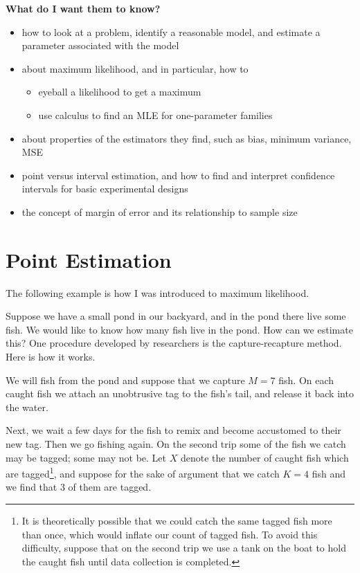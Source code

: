 \documentclass[]{book}
\providecommand{\tightlist}{%
  \setlength{\itemsep}{0pt}\setlength{\parskip}{0pt}}
\let\rmarkdownfootnote\footnote%
\def\footnote{\protect\rmarkdownfootnote}
\numberwithin{equation}{chapter}
\numberwithin{figure}{chapter}
\theoremstyle{plain}
\theoremstyle{definition}
\theoremstyle{remark}
\theoremstyle{definition}
\theoremstyle{definition}
\theoremstyle{remark}
\let\BeginKnitrBlock\begin \let\EndKnitrBlock\end
\begin{document}
\textbf{What do I want them to know?}

\begin{itemize}
\tightlist
\item
  how to look at a problem, identify a reasonable model, and estimate a
  parameter associated with the model
\item
  about maximum likelihood, and in particular, how to

  \begin{itemize}
  \tightlist
  \item
    eyeball a likelihood to get a maximum
  \item
    use calculus to find an MLE for one-parameter families
  \end{itemize}
\item
  about properties of the estimators they find, such as bias, minimum
  variance, MSE
\item
  point versus interval estimation, and how to find and interpret
  confidence intervals for basic experimental designs
\item
  the concept of margin of error and its relationship to sample size
\end{itemize}

\section{Point Estimation}\label{sec-point-estimation}

The following example is how I was introduced to maximum likelihood.

\bigskip

\BeginKnitrBlock{example}[Fishing, part one]
\protect\hypertarget{ex:how-many-fish}{}{\label{ex:how-many-fish}
\iffalse (Fishing, part one) \fi }Suppose we have a small pond in our
backyard, and in the pond there live some fish. We would like to know
how many fish live in the pond. How can we estimate this? One procedure
developed by researchers is the capture-recapture method. Here is how it
works.
\EndKnitrBlock{example}

We will fish from the pond and suppose that we capture \(M=7\) fish. On
each caught fish we attach an unobtrusive tag to the fish's tail, and
release it back into the water.

Next, we wait a few days for the fish to remix and become accustomed to
their new tag. Then we go fishing again. On the second trip some of the
fish we catch may be tagged; some may not be. Let \(X\) denote the
number of caught fish which are tagged\footnote{It is theoretically
  possible that we could catch the same tagged fish more than once,
  which would inflate our count of tagged fish. To avoid this
  difficulty, suppose that on the second trip we use a tank on the boat
  to hold the caught fish until data collection is completed.}, and
suppose for the sake of argument that we catch \(K=4\) fish and we find
that 3 of them are tagged.
\end{document}
